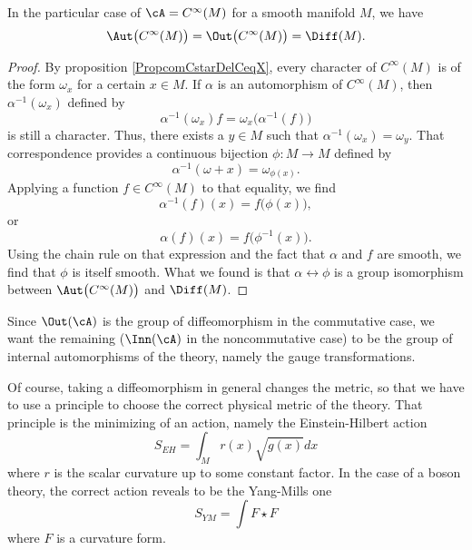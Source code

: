 \begin{proposition}
In the particular case of $\cA= C^{\infty}(M)$ for a smooth manifold $M$, we have
\[ 
  \Aut\big(  C^{\infty}(M) \big)=\Out\big(  C^{\infty}(M) \big)=\Diff(M).
\]
\end{proposition}

\begin{proof}

By proposition \ref{PropcomCstarDelCeqX}, every character of $ C^{\infty}(M)$ is of the form $\omega_x$ for a certain $x\in M$. If $\alpha$ is an automorphism of $ C^{\infty}(M)$, then $\alpha^{-1}(\omega_x)$ defined by
\[ 
  \alpha^{-1}(\omega_x)f=\omega_x\big( \alpha^{-1}(f) \big)
\]
is still a character. Thus, there exists a $y\in M$ such that $\alpha^{-1}(\omega_x)=\omega_y$. That correspondence provides a continuous bijection $\phi\colon M\to M$ defined by
\[ 
  \alpha^{-1}(\omega+x)=\omega_{\phi(x)}.
\]
Applying a function $f\in C^{\infty}(M)$ to that equality, we find
\[ 
  \alpha^{-1}(f)(x)=f\big( \phi(x) \big),
\]
or
\begin{equation}
\alpha(f)(x)=f\big( \phi^{-1}(x) \big).
\end{equation}
Using the chain rule on that expression and the fact that $\alpha$ and $f$ are smooth, we find that $\phi$ is itself smooth. What we found is that $\alpha\leftrightarrow \phi$ is a group isomorphism between $\Aut\big(  C^{\infty}(M) \big)$ and $\Diff(M)$.
\end{proof}

Since $\Out(\cA)$ is the group of diffeomorphism in the commutative case, we want the remaining ($\Inn(\cA)$ in the noncommutative case) to be the group of internal automorphisms of the theory, namely the gauge transformations.

Of course, taking a diffeomorphism in general changes the metric, so that we have to use a principle to choose the correct physical metric of the theory. That principle is the minimizing of an action, namely the Einstein-Hilbert action
\[ 
  S_{EH}=\int_Mr(x)\sqrt{g(x)}dx
\]
where $r$ is the scalar curvature up to some constant factor. In the case of a boson theory, the correct action reveals to be the Yang-Mills one
\[ 
  S_{YM}=\int F\star F
\]
where $F$ is a curvature form.


